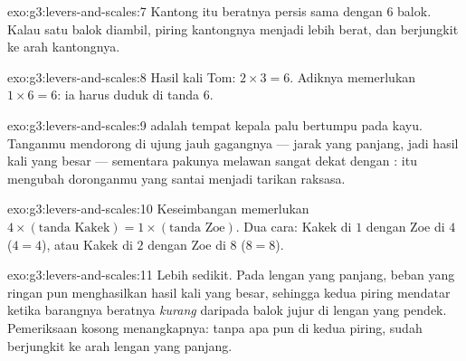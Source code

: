 \begin{solution}{exo:g3:levers-and-scales:7}
Kantong itu beratnya persis sama dengan $6$ balok. Kalau satu balok
diambil, piring kantongnya menjadi lebih berat, dan 
berjungkit ke arah kantongnya.
\end{solution}

\begin{solution}{exo:g3:levers-and-scales:8}
Hasil kali Tom: $2 \times 3 = 6$. Adiknya memerlukan $1 \times 6 = 6$:
ia harus duduk di tanda $6$.
\end{solution}

\begin{solution}{exo:g3:levers-and-scales:9}
 adalah tempat kepala palu bertumpu pada kayu. Tanganmu
mendorong di ujung jauh gagangnya --- jarak yang panjang, jadi hasil
kali yang besar --- sementara pakunya melawan sangat dekat dengan
:  itu mengubah doronganmu yang santai menjadi tarikan
raksasa.
\end{solution}

\begin{solution}{exo:g3:levers-and-scales:10}
Keseimbangan memerlukan $4 \times (\text{tanda Kakek}) = 1 \times
(\text{tanda Zoe})$. Dua cara: Kakek di $1$ dengan Zoe di $4$
($4 = 4$), atau Kakek di $2$ dengan Zoe di $8$ ($8 = 8$).
\end{solution}

\begin{solution}{exo:g3:levers-and-scales:11}
Lebih sedikit. Pada lengan yang panjang, beban yang ringan pun
menghasilkan hasil kali yang besar, sehingga kedua piring mendatar
ketika barangnya beratnya \emph{kurang} daripada balok jujur di lengan
yang pendek. Pemeriksaan  kosong menangkapnya: tanpa apa pun di
kedua piring,  sudah berjungkit ke arah lengan yang panjang.
\end{solution}
